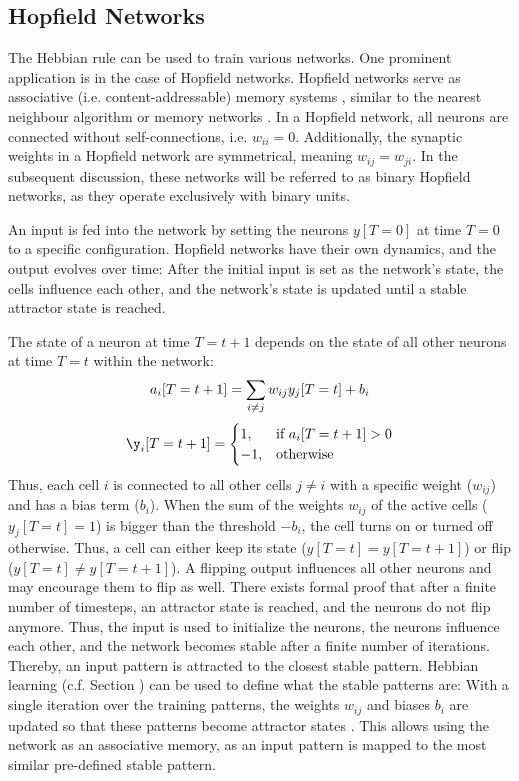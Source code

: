 \subsection{Hopfield Networks}
The Hebbian rule can be used to train various networks.
One prominent application is in the case of Hopfield networks.
Hopfield networks serve as associative (i.e. content-addressable) memory systems , similar to the nearest neighbour algorithm  or memory networks .
In a Hopfield network, all neurons are connected without self-connections, i.e. $w_{ii}=0$.
Additionally, the synaptic weights in a Hopfield network are symmetrical, meaning \(w_{ij} = w_{ji}\).
In the subsequent discussion, these networks will be referred to as binary Hopfield networks, as they operate exclusively with binary units.

An input is fed into the network by setting the neurons $y[T=0]$ at time $T=0$ to a specific configuration.
Hopfield networks have their own dynamics, and the output evolves over time: After the initial input is set as the network's state, the cells influence each other, and the network's state is updated until a stable attractor state is reached.

The state of a neuron at time $T=t+1$ depends on the state of all other neurons at time $T=t$ within the network:
%
\begin{align}\eqlbl{hf_1}
	a_i[T=t+1] = \sum_{i \neq j} w_{ij} y_j[T=t] + b_i
\end{align}
%
\begin{align}\eqlbl{hf_2}
	\y_i[T=t+1] = \begin{cases}
      		1, & \text{if } a_i[T=t+1] > 0 \\
      		-1, & \text{otherwise}
    	\end{cases}
\end{align}
%
Thus, each cell $i$ is connected to all other cells $j \neq i$ with a specific weight ($w_{ij}$) and has a bias term ($b_i$). 
When the sum of the weights $w_{ij}$ of the active cells ($y_j[T=t] = 1$) is bigger than the threshold $-b_i$, the cell turns on or turned off otherwise.
Thus, a cell can either keep its state ($y[T=t] = y[T=t+1]$) or flip ($y[T=t] \neq y[T=t+1]$).
A flipping output influences all other neurons and may encourage them to flip as well.
There exists formal proof that after a finite number of timesteps, an attractor state is reached, and the neurons do not flip anymore\cite{hopfield_neural_1982}.
Thus, the input is used to initialize the neurons, the neurons influence each other, and the network becomes stable after a finite number of iterations. Thereby, an input pattern is attracted to the closest stable pattern.
Hebbian learning (c.f. Section ) can be used to define what the stable patterns are:
With a single iteration over the training patterns, the weights $w_{ij}$ and biases $b_i$ are updated so that these patterns become attractor states .
This allows using the network as an associative memory, as an input pattern is mapped to the most similar pre-defined stable pattern.

